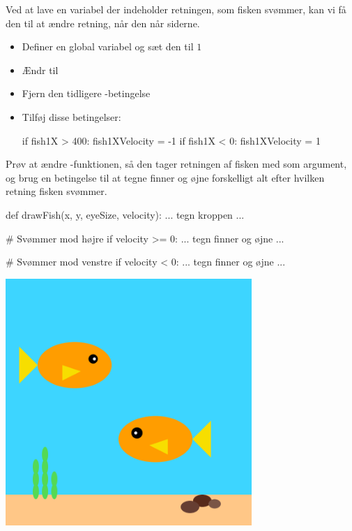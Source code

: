 \documentclass{ucph-handout}
\begin{document}
\begin{exercisebox}[adjusted title=Skifte retning]
Ved at lave en variabel der indeholder retningen, som fisken svømmer,
kan vi få den til at ændre retning, når den når siderne.

\begin{itemize}
\item Definer en global variabel  og sæt den til $1$
\item Ændr  til 
\item Fjern den tidligere -betingelse
\item Tilføj disse betingelser:
\begin{python}
if fish1X > 400:
    fish1XVelocity = -1
if fish1X < 0:
    fish1XVelocity = 1
\end{python}
\end{itemize}
\end{exercisebox}

\begin{exercisebox}[adjusted title=Ændre udseende]
Prøv at ændre -funktionen, så den tager retningen af
fisken med som argument, og brug en betingelse til at tegne finner og
øjne forskelligt alt efter hvilken retning fisken svømmer.

\begin{minipage}{0.60\linewidth}
\begin{python}
def drawFish(x, y, eyeSize, velocity):
    ... tegn kroppen ...

    # Svømmer mod højre
    if velocity >= 0:
        ... tegn finner og øjne ...

    # Svømmer mod venstre
    if velocity < 0:
        ... tegn finner og øjne ...
\end{python}
\end{minipage}
\begin{minipage}{0.40\linewidth}
\includegraphics[width=0.70\textwidth]{../illustrations/images/fisk-begge-retninger.png}
\end{minipage}
\end{exercisebox}
\end{document}
